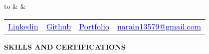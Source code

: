 \documentclass[10pt,a4]{article}
\begin{document}
{\selectfont	
	\renewcommand{\familydefault}{\sfdefault}

	\noindent
	\begin{tabu} to \textwidth {X[1] X[c] X[r]}
		  &    &   		\\
	\end{tabu}

    \vspace{-2mm}
 
	

    \begin{center}
    \begin{tabular} {p{} p{} p{} p{}}
        \raggedright\href{https://wwww.linkedin.com/in/narainp}{\textcolor{blue}{Linkedin}} & 
        \href{https://github.com/narain1}{\textcolor{blue}{Github}} & 
        \href{https://narain1.netlify.app/}{\textcolor{blue}{Portfolio}} & 
        \raggedright\href{mailto:narain13579@gmail.com}{\textcolor{blue}{narain13579@gmail.com}} 
    \end{tabular}
    \end{center}
    
    \vspace{-2mm}

	

\begin{flushleft}
    {\Large \textbf {SKILLS AND CERTIFICATIONS}}
    

\end{flushleft}}
\end{document}
